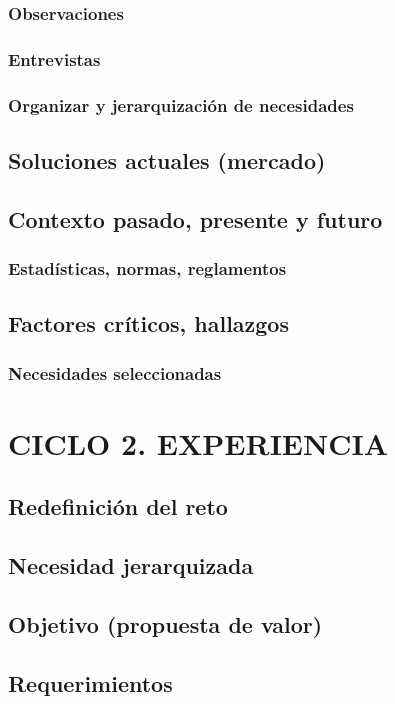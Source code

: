\documentclass[12pt,letterpaper]{book}
\begin{document}
\subsection{Observaciones}
\subsection{Entrevistas}
\subsection{Organizar y jerarquización de necesidades}
\section{Soluciones actuales (mercado)}
\section{Contexto pasado, presente y futuro}
\subsection{Estadísticas, normas, reglamentos}
\section{Factores críticos, hallazgos}
\subsection{Necesidades seleccionadas}

\newpage

\chapter{CICLO 2. EXPERIENCIA}
\section{Redefinición del reto}
\section{Necesidad jerarquizada}
\section{Objetivo (propuesta de valor)}
\section{Requerimientos}
\end{document}
